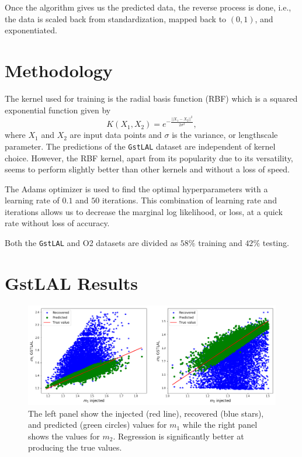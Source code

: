 \documentclass[aps,prd,twocolumn,superscriptaddress,preprintnumbers,floatfix,nofootinbib]{revtex4-2}
\begin{document}
Once the algorithm gives us the predicted data, the reverse process is done, i.e., 
the data is scaled back from standardization, mapped back to $(0,1)$, and exponentiated. 

\section{Methodology}

The kernel used for training is the radial basis function (RBF) which is a squared
exponential function given by
\begin{equation}
K(X_1, X_2) = e^{-\frac{||X_1-X_2||^2}{2 \sigma^2}},
\end{equation}
where $X_1$ and $X_2$ are input data points and $\sigma$ is the variance, or lengthscale
parameter. The 
predictions of the \texttt{GstLAL} dataset are independent of kernel choice. However, 
the RBF kernel, apart from its popularity due to its versatility, seems to perform slightly 
better than other kernels and without a loss of speed.

The Adams optimizer is used to find the optimal hyperparameters with a learning rate of 
$0.1$ and $50$ iterations. This combination of learning rate and iterations allows us to 
decrease the marginal log likelihood, or loss, at a quick rate without loss of accuracy. 

Both the \texttt{GstLAL} and O2 datasets are divided as $58\%$ training and $42\%$ 
testing.

\section{GstLAL Results}

\begin{figure}[!h]
	\centering
	\includegraphics[width=\linewidth]{m1_m2_comparisons.png}
	\caption{%
	 		The left panel show the injected (red line), recovered (blue stars), and 
			predicted (green circles) values for $m_1$ while the right panel shows the 
			values for $m_2$. Regression is significantly better at producing the true 
			values.}
	\label{fig:regression}
\end{figure}
\end{document}
